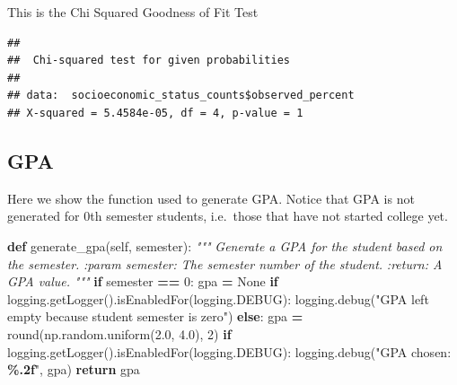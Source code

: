 \documentclass[
  twocolumn]{article}
\newenvironment{Shaded}{\begin{snugshade}}{\end{snugshade}}
\newcommand{\AttributeTok}[1]{\textcolor[rgb]{0.13,0.29,0.53}{#1}}
\newcommand{\BuiltInTok}[1]{#1}
\newcommand{\CommentTok}[1]{\textcolor[rgb]{0.56,0.35,0.01}{\textit{#1}}}
\newcommand{\ControlFlowTok}[1]{\textcolor[rgb]{0.13,0.29,0.53}{\textbf{#1}}}
\newcommand{\DecValTok}[1]{\textcolor[rgb]{0.00,0.00,0.81}{#1}}
\newcommand{\FloatTok}[1]{\textcolor[rgb]{0.00,0.00,0.81}{#1}}
\newcommand{\FunctionTok}[1]{\textcolor[rgb]{0.13,0.29,0.53}{\textbf{#1}}}
\newcommand{\KeywordTok}[1]{\textcolor[rgb]{0.13,0.29,0.53}{\textbf{#1}}}
\newcommand{\NormalTok}[1]{#1}
\newcommand{\OperatorTok}[1]{\textcolor[rgb]{0.81,0.36,0.00}{\textbf{#1}}}
\newcommand{\SpecialCharTok}[1]{\textcolor[rgb]{0.81,0.36,0.00}{\textbf{#1}}}
\newcommand{\StringTok}[1]{\textcolor[rgb]{0.31,0.60,0.02}{#1}}
\newcommand{\VariableTok}[1]{\textcolor[rgb]{0.00,0.00,0.00}{#1}}
\begin{document}
This is the Chi Squared Goodness of Fit Test

\begin{Shaded}
\end{Shaded}

\begin{verbatim}
## 
##  Chi-squared test for given probabilities
## 
## data:  socioeconomic_status_counts$observed_percent
## X-squared = 5.4584e-05, df = 4, p-value = 1
\end{verbatim}

\subsection{GPA}\label{gpa}

Here we show the function used to generate GPA. Notice that GPA is not
generated for 0th semester students, i.e.~those that have not started
college yet.

\begin{Shaded}
\begin{Highlighting}[]
\KeywordTok{def}\NormalTok{ generate\_gpa(}\VariableTok{self}\NormalTok{, semester):}
        \CommentTok{"""}
\CommentTok{        Generate a GPA for the student based on the semester.}
\CommentTok{        :param semester: The semester number of the student.}
\CommentTok{        :return: A GPA value.}
\CommentTok{        """}
        \ControlFlowTok{if}\NormalTok{ semester }\OperatorTok{==} \DecValTok{0}\NormalTok{:}
\NormalTok{            gpa }\OperatorTok{=} \VariableTok{None}
            \ControlFlowTok{if}\NormalTok{ logging.getLogger().isEnabledFor(logging.DEBUG):}
\NormalTok{                logging.debug(}\StringTok{"GPA left empty because student semester is zero"}\NormalTok{)}
        \ControlFlowTok{else}\NormalTok{:}
\NormalTok{            gpa }\OperatorTok{=} \BuiltInTok{round}\NormalTok{(np.random.uniform(}\FloatTok{2.0}\NormalTok{, }\FloatTok{4.0}\NormalTok{), }\DecValTok{2}\NormalTok{)}
            \ControlFlowTok{if}\NormalTok{ logging.getLogger().isEnabledFor(logging.DEBUG):}
\NormalTok{                logging.debug(}\StringTok{"GPA chosen: }\SpecialCharTok{\%.2f}\StringTok{"}\NormalTok{, gpa)}
        \ControlFlowTok{return}\NormalTok{ gpa}
\end{Highlighting}
\end{Shaded}
\end{document}
